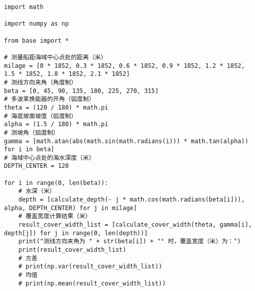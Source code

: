 \begin{lstlisting}[caption={question2.py}]
import math

import numpy as np

from base import *

# 测量船距海域中心点处的距离（米）
milage = [0 * 1852, 0.3 * 1852, 0.6 * 1852, 0.9 * 1852, 1.2 * 1852, 1.5 * 1852, 1.8 * 1852, 2.1 * 1852]
# 测线方向夹角（角度制）
beta = [0, 45, 90, 135, 180, 225, 270, 315]
# 多波束换能器的开角（弧度制）
theta = (120 / 180) * math.pi
# 海底坡面坡度（弧度制）
alpha = (1.5 / 180) * math.pi
# 测坡角（弧度制）
gamma = [math.atan(abs(math.sin(math.radians(i))) * math.tan(alpha)) for i in beta]
# 海域中心点处的海水深度（米）
DEPTH_CENTER = 120

for i in range(0, len(beta)):
    # 水深（米）
    depth = [calculate_depth(- j * math.cos(math.radians(beta[i])), alpha, DEPTH_CENTER) for j in milage]
    # 覆盖宽度计算结果（米）
    result_cover_width_list = [calculate_cover_width(theta, gamma[i], depth[j]) for j in range(0, len(depth))]
    print("测线方向夹角为 " + str(beta[i]) + "° 时，覆盖宽度（米）为：")
    print(result_cover_width_list)
    # 方差
    # print(np.var(result_cover_width_list))
    # 均值
    # print(np.mean(result_cover_width_list))    
\end{lstlisting}

